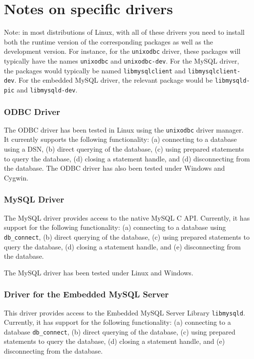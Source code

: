 \section{Notes on specific drivers}

Note: in most distributions of Linux,
with all of these drivers you need to install both the runtime
version of the corresponding packages as well as the development version.
For instance, for the \texttt{unixodbc} driver, these packages will
typically have the names \texttt{unixodbc} and \texttt{unixodbc-dev}.
For the MySQL driver, the packages would typically be named
\texttt{libmysqlclient} and \texttt{libmysqlclient-dev}.  
For the embedded MySQL driver, the relevant package would be
\texttt{libmysqld-pic} and 
\texttt{libmysqld-dev}. 

\subsubsection{ODBC Driver}

The ODBC driver has been tested in Linux using the {\tt unixodbc} driver
manager.  It currently supports the following functionality: (a)
connecting to a database using a DSN, (b) direct querying of the database,
(c) using prepared statements to query the database, (d) closing a
statement handle, and (d) disconnecting from the database.
The ODBC driver has also been tested under Windows and Cygwin.


\subsubsection{MySQL Driver}

The MySQL driver provides access to the native MySQL C API.
Currently, it has support for the following functionality: (a) connecting
to a database using {\tt db\_connect}, (b) direct querying of
the database, (c) using prepared statements to query the database, (d) closing a
statement handle, and (e) disconnecting from the database.

The MySQL driver has been tested under Linux and Windows.


\subsubsection{Driver for the Embedded MySQL Server}

This driver provides access to the Embedded MySQL Server Library {\tt libmysqld}. Currently, it has support for the following functionality: (a) connecting
to a database {\tt db\_connect}, (b) direct querying of
the database, (c) using prepared statements to query the database, (d) closing a
statement handle, and (e) disconnecting from the database.

